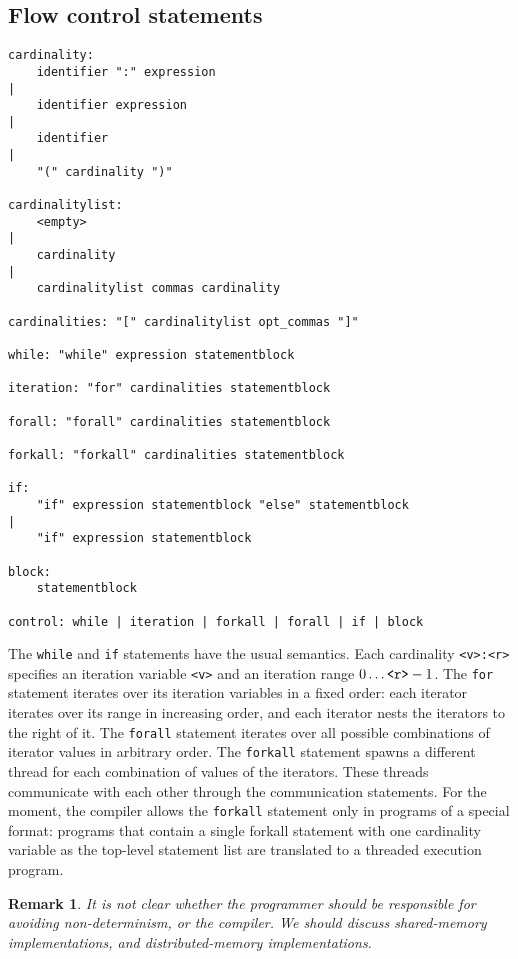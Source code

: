 \documentclass[a4paper]{article}
\newtheorem{remark}{Remark}
\begin{document}
\subsection{Flow control statements}
\begin{verbatim}
cardinality:
    identifier ":" expression
|
    identifier expression
|
    identifier 
|
    "(" cardinality ")"

cardinalitylist:
    <empty>
|
    cardinality
|
    cardinalitylist commas cardinality

cardinalities: "[" cardinalitylist opt_commas "]"

while: "while" expression statementblock

iteration: "for" cardinalities statementblock

forall: "forall" cardinalities statementblock

forkall: "forkall" cardinalities statementblock

if:
    "if" expression statementblock "else" statementblock
|
    "if" expression statementblock

block:
    statementblock

control: while | iteration | forkall | forall | if | block
\end{verbatim}
The \verb'while' and \verb'if' statements have the usual semantics.
Each cardinality \verb'<v>:<r>' specifies an iteration variable
\verb'<v>' and an iteration range $0 \ldots \verb'<r>'-1$.
The \verb'for' statement iterates over its iteration variables in a fixed
order: each iterator iterates over its range in increasing order, and
each iterator nests the iterators to the right of it.
The \verb'forall' statement iterates over all possible combinations of
iterator values in arbitrary order.
The \verb'forkall' statement spawns a different thread for
each combination of values of the iterators.
These threads communicate with each other through the communication
statements.
For the moment, the compiler allows the \verb'forkall' statement only
in programs of a special format: programs that contain a single
forkall statement with one cardinality variable as the top-level statement
list are translated to a threaded execution program.
\begin{remark}
It is not clear whether the programmer should be responsible for
avoiding non-determinism, or the compiler.
We should discuss shared-memory implementations, and distributed-memory
implementations.
\end{remark}
\end{document}

